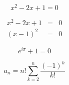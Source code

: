\documentclass{jsarticle}
\begin{document}
 
 \begin{equation}
  x^2 - 2x + 1 = 0
 \end{equation}

 \begin{eqnarray}
  x^2 - 2x + 1 & = & 0 \\
  (x - 1)^2 & = & 0
 \end{eqnarray}
 
 \begin{equation}
  e^{i\pi} + 1 = 0
 \end{equation}
 
 \begin{equation}
  a_n = n!\sum_{k=2}^n \frac{(-1)^k}{k!}
 \end{equation}
\end{document}
